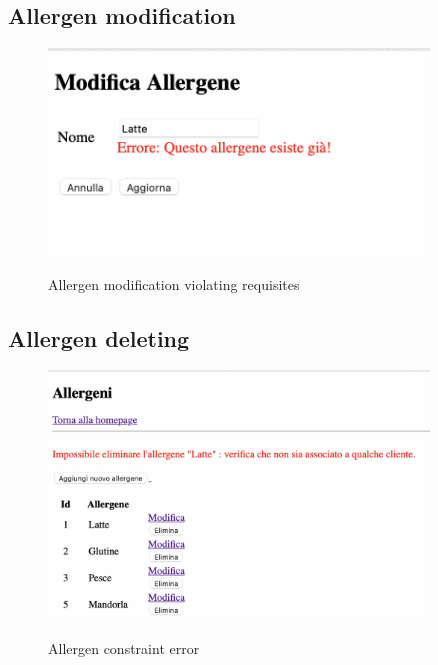 \documentclass{article}
\begin{document}
    \vspace*{5mm}

    \subsection*{Allergen modification}
    \begin{figure}[H]
        \centering
        \includegraphics[width=0.9\textwidth]{images/allergen_validation_error.png}
        \label{fig:allergen_validation_error}
        \caption{Allergen modification violating requisites}
    \end{figure}

    \vspace*{5mm}

    \subsection*{Allergen deleting}
    \begin{figure}[H]
        \centering
        \includegraphics[width=0.9\textwidth]{images/allergen_constraint_error.png}
        \label{fig:allergen_constraint_error}
        \caption{Allergen constraint error}
    \end{figure}
\end{document}
